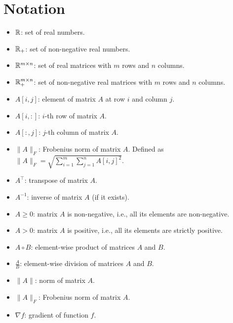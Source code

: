 \chapter*{Notation}
\begin{itemize}
    \item[--] $\mathbb{R}$: set of real numbers.
    \item[--] $\mathbb{R}_+$: set of non-negative real numbers.
    \item[--] $\mathbb{R}^{m \times n}$: set of real matrices with $m$ rows and $n$ columns.
    \item[--] $\mathbb{R}_+^{m \times n}$: set of non-negative real matrices with $m$ rows and $n$ columns.
    \item[--] $A[i,j]$: element of matrix $A$ at row $i$ and column $j$.
    \item[--] $A[i,:]$: $i$-th row of matrix $A$.
    \item[--] $A[:,j]$: $j$-th column of matrix $A$.
    \item[--] $\|A\|_F$: Frobenius norm of matrix $A$. Defined as $\|A\|_F = \sqrt{\sum_{i=1}^{m} \sum_{j=1}^{n} A[i,j]^2}$.
    \item[--] $A^\top$: transpose of matrix $A$.
    \item[--] $A^{-1}$: inverse of matrix $A$ (if it exists).
    \item[--] $A \geq 0$: matrix $A$ is non-negative, i.e., all its elements are non-negative.
    \item[--] $A > 0$: matrix $A$ is positive, i.e., all its elements are strictly positive.
    \item[--] $A \circ B$: element-wise product of matrices $A$ and $B$.
    \item[--] $\frac{A}{B}$: element-wise division of matrices $A$ and $B$.
    \item[--] $\| A \|$: norm of matrix $A$.
    \item[--] $\| A \|_F$: Frobenius norm of matrix $A$.
    \item[--] $\nabla f$: gradient of function $f$.
\end{itemize}


